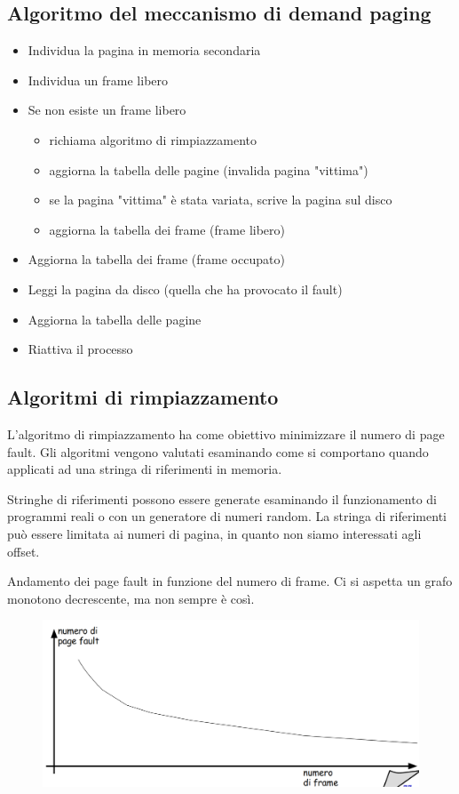 \newpage
\subsection{Algoritmo del meccanismo di demand paging}
\begin{itemize}
    \item Individua la pagina in memoria secondaria
    \item Individua un frame libero
    \item Se non esiste un frame libero
        \begin{itemize}
            \item richiama algoritmo di rimpiazzamento
            \item aggiorna la tabella delle pagine (invalida pagina "vittima")
            \item se la pagina "vittima" è stata variata, scrive la pagina sul disco
            \item aggiorna la tabella dei frame (frame libero)
        \end{itemize}
    \item Aggiorna la tabella dei frame (frame occupato)
    \item Leggi la pagina da disco (quella che ha provocato il fault)
    \item Aggiorna la tabella delle pagine
    \item Riattiva il processo
\end{itemize}

\subsection{Algoritmi di rimpiazzamento}
L'algoritmo di rimpiazzamento ha come obiettivo minimizzare il numero di page fault.
Gli algoritmi vengono valutati esaminando come si comportano
quando applicati ad una stringa di riferimenti in memoria.

Stringhe di riferimenti possono essere generate esaminando il funzionamento di programmi reali o con un generatore di numeri random. La stringa di riferimenti può essere limitata ai numeri di pagina, in quanto non siamo interessati agli offset.

Andamento dei page fault in funzione del numero di frame.
Ci si aspetta un grafo monotono decrescente, ma non sempre è così.

\begin{figure} [h]
    \centering
    \includegraphics[width=0.7\linewidth]{Images/Screenshot 2025-01-17 at 17-37-53 so-05-memoria - so-05-memoria.pdf.png}
\end{figure}

